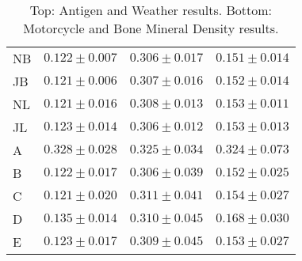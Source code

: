 \documentclass[twoside]{article} \usepackage{aistats2017}
\theoremstyle{definition}
\theoremstyle{theorem}
\begin{document}
\begin{table*}
\begin{center}
{\begin{tabular}{l|ccc}
									NB & $0.122 \pm 0.007$ & $\mathbf{0.306 \pm 0.017}$ & $\mathbf{0.151 \pm
										0.014}$ \\
									JB & $0.121 \pm 0.006$ & $0.307 \pm 0.016$ & $0.152 \pm 0.014$ \\
									NL & $0.121 \pm 0.016$ & $0.308 \pm 0.013$ & $0.153 \pm 0.011$ \\
									JL & $0.123 \pm 0.014$ & $\mathbf{0.306 \pm 0.012}$ & $0.153 \pm 0.013$ \\
									A & $0.328 \pm 0.028$ & $0.325 \pm 0.034$ & $0.324 \pm 0.073$ \\
									B & $0.122 \pm 0.017$ & $\mathbf{0.306 \pm 0.039}$ & $0.152 \pm 0.025$ \\
									C & $0.121 \pm 0.020$ & $0.311 \pm 0.041$ & $0.154 \pm 0.027$ \\
									D & $0.135 \pm 0.014$ & $0.310 \pm 0.045$ & $0.168 \pm 0.030$ \\
									E & $0.123 \pm 0.017$ & $0.309 \pm 0.045$ & $0.153 \pm 0.027$
								\end{tabular}}
							\end{center}
							
							\caption{Top: Antigen and Weather results. Bottom: Motorcycle and Bone Mineral Density results.}
							
							\label{table:results}
						\end{table*}
						
						
\end{document}
